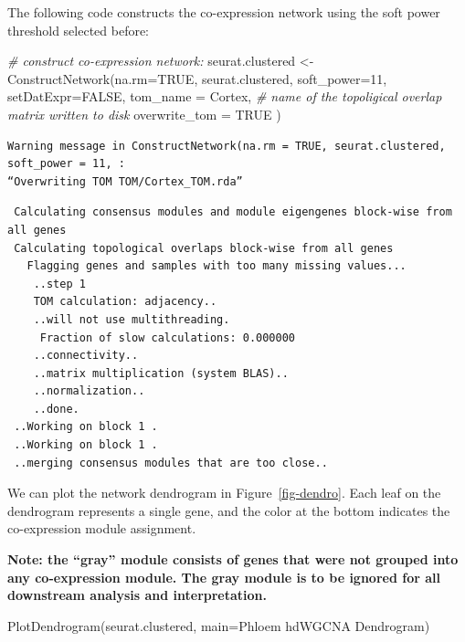 \documentclass[
  letterpaper,
  DIV=11,
  numbers=noendperiod]{scrartcl}
\newenvironment{Shaded}{\begin{snugshade}}{\end{snugshade}}
\newcommand{\AttributeTok}[1]{\textcolor[rgb]{0.49,0.56,0.16}{#1}}
\newcommand{\CommentTok}[1]{\textcolor[rgb]{0.38,0.63,0.69}{\textit{#1}}}
\newcommand{\ConstantTok}[1]{\textcolor[rgb]{0.53,0.00,0.00}{#1}}
\newcommand{\DecValTok}[1]{\textcolor[rgb]{0.25,0.63,0.44}{#1}}
\newcommand{\FunctionTok}[1]{\textcolor[rgb]{0.02,0.16,0.49}{#1}}
\newcommand{\NormalTok}[1]{\textcolor[rgb]{0.00,0.44,0.13}{#1}}
\newcommand{\OtherTok}[1]{\textcolor[rgb]{0.00,0.44,0.13}{#1}}
\newcommand{\StringTok}[1]{\textcolor[rgb]{0.25,0.44,0.63}{#1}}
\begin{document}
The following code constructs the co-expression network using the soft
power threshold selected before:

\begin{Shaded}
\begin{Highlighting}[]
\CommentTok{\# construct co{-}expression network:}
\NormalTok{seurat.clustered }\OtherTok{\textless{}{-}} \FunctionTok{ConstructNetwork}\NormalTok{(}\AttributeTok{na.rm=}\ConstantTok{TRUE}\NormalTok{,}
\NormalTok{  seurat.clustered,}
  \AttributeTok{soft\_power=}\DecValTok{11}\NormalTok{,                                   }
  \AttributeTok{setDatExpr=}\ConstantTok{FALSE}\NormalTok{,}
  \AttributeTok{tom\_name =} \StringTok{\textquotesingle{}Cortex\textquotesingle{}}\NormalTok{, }\CommentTok{\# name of the topoligical overlap matrix written to disk}
  \AttributeTok{overwrite\_tom =} \ConstantTok{TRUE}
\NormalTok{)}
\end{Highlighting}
\end{Shaded}

\begin{verbatim}
Warning message in ConstructNetwork(na.rm = TRUE, seurat.clustered, soft_power = 11, :
“Overwriting TOM TOM/Cortex_TOM.rda”
\end{verbatim}

\begin{verbatim}
 Calculating consensus modules and module eigengenes block-wise from all genes
 Calculating topological overlaps block-wise from all genes
   Flagging genes and samples with too many missing values...
    ..step 1
    TOM calculation: adjacency..
    ..will not use multithreading.
     Fraction of slow calculations: 0.000000
    ..connectivity..
    ..matrix multiplication (system BLAS)..
    ..normalization..
    ..done.
 ..Working on block 1 .
 ..Working on block 1 .
 ..merging consensus modules that are too close..
\end{verbatim}

We can plot the network dendrogram in Figure~\ref{fig-dendro}. Each leaf
on the dendrogram represents a single gene, and the color at the bottom
indicates the co-expression module assignment.

\textbf{Note: the ``gray'' module consists of genes that were not
grouped into any co-expression module. The gray module is to be ignored
for all downstream analysis and interpretation.}

\begin{Shaded}
\begin{Highlighting}[]
\FunctionTok{PlotDendrogram}\NormalTok{(seurat.clustered, }\AttributeTok{main=}\StringTok{\textquotesingle{}Phloem hdWGCNA Dendrogram\textquotesingle{}}\NormalTok{)}
\end{Highlighting}
\end{Shaded}
\end{document}
